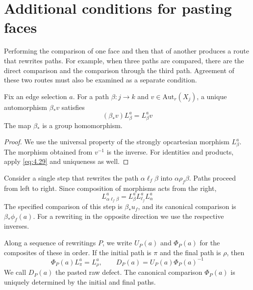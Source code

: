 \section{Additional conditions for pasting faces}\label{sec:4.7}

Performing the comparison of one face and then that of another produces a route that
rewrites paths.
For example, when three paths are compared, there are the direct comparison and the
comparison through the third path.
Agreement of these two routes must also be examined as a separate condition.

\begin{lemma}\label{lem:4.24}

Fix an edge selection $a$.
For a path $\beta:j\to k$ and $v\in\mathrm{Aut}_r(X_j)$, a unique automorphism
$\beta_*v$ satisfies
\begin{equation*}
(\beta_*v)L_\beta^a=L_\beta^av
\tag{4.29}\label{eq:4.29}
\end{equation*}
The map $\beta_*$ is a group homomorphism.
\end{lemma}

\begin{proof}

We use the universal property of the strongly opcartesian morphism $L_\beta^a$.
The morphism obtained from $v^{-1}$ is the inverse.
For identities and products, apply \eqref{eq:4.29} and uniqueness as well.

\end{proof}

\begin{construction}\label{cons:4.25}

Consider a single step that rewrites the path $\alpha\ell_f\beta$ into
$\alpha \rho_f\beta$.
Paths proceed from left to right. Since composition of morphisms acts from the right,
\[
L_{\alpha\ell_f\beta}^{a}
=L_\beta^{a}L_{\ell_f}^{a}L_\alpha^{a}
\]
The specified comparison of this step is $\beta_*u_f$, and its canonical comparison is
$\beta_*\phi_f(a)$.
For a rewriting in the opposite direction we use the respective inverses.

Along a sequence of rewritings $P$, we write $U_P(a)$ and $\Phi_P(a)$ for the composites
of these in order.
If the initial path is $\pi$ and the final path is $\rho$, then
\begin{equation*}
\Phi_P(a)L_\pi^a=L_\rho^a,\qquad
D_P(a)=U_P(a)\Phi_P(a)^{-1}
\tag{4.30}\label{eq:4.30}
\end{equation*}
We call $D_P(a)$ the pasted raw defect.
The canonical comparison $\Phi_P(a)$ is uniquely determined by the initial and final
paths.

\end{construction}


